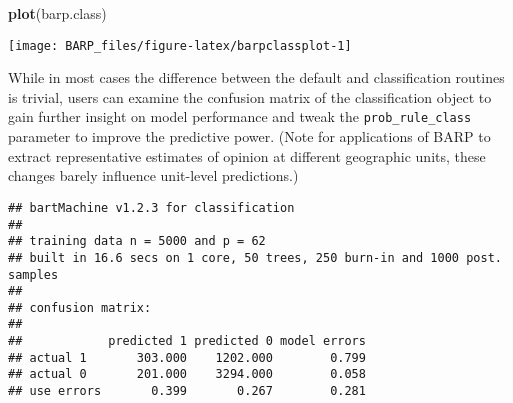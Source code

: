\documentclass[]{article}
\newenvironment{Shaded}{\begin{snugshade}}{\end{snugshade}}
\newcommand{\KeywordTok}[1]{\textcolor[rgb]{0.13,0.29,0.53}{\textbf{#1}}}
\newcommand{\DataTypeTok}[1]{\textcolor[rgb]{0.13,0.29,0.53}{#1}}
\newcommand{\StringTok}[1]{\textcolor[rgb]{0.31,0.60,0.02}{#1}}
\newcommand{\OperatorTok}[1]{\textcolor[rgb]{0.81,0.36,0.00}{\textbf{#1}}}
\newcommand{\NormalTok}[1]{#1}
\begin{document}
\begin{Shaded}
\end{Shaded}

\begin{Shaded}
\begin{Highlighting}[]
\KeywordTok{plot}\NormalTok{(barp.class)}
\end{Highlighting}
\end{Shaded}

\begin{center}\texttt{[image: BARP\_files/figure-latex/barpclassplot-1]} \end{center}

While in most cases the difference between the default and
classification routines is trivial, users can examine the confusion
matrix of the classification object to gain further insight on model
performance and tweak the \texttt{prob\_rule\_class} parameter to
improve the predictive power. (Note for applications of BARP to extract
representative estimates of opinion at different geographic units, these
changes barely influence unit-level predictions.)

\begin{Shaded}
\end{Shaded}

\begin{verbatim}
## bartMachine v1.2.3 for classification
## 
## training data n = 5000 and p = 62 
## built in 16.6 secs on 1 core, 50 trees, 250 burn-in and 1000 post. samples
## 
## confusion matrix:
## 
##            predicted 1 predicted 0 model errors
## actual 1       303.000    1202.000        0.799
## actual 0       201.000    3294.000        0.058
## use errors       0.399       0.267        0.281
\end{verbatim}
\end{document}
